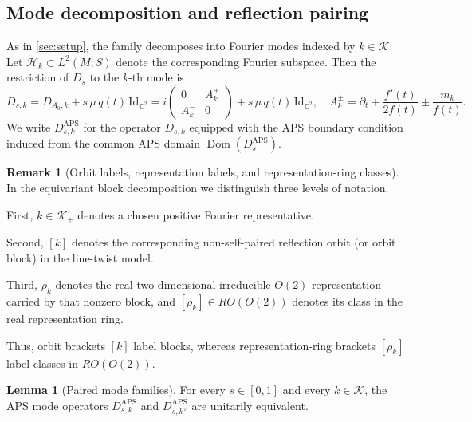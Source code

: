 \documentclass[11pt]{article}
\theoremstyle{definition}
\newtheorem{lemma}[theorem]{Lemma}
\newtheorem{remark}[remark]{Remark}
\DeclareMathOperator{\APS}{APS}
\DeclareMathOperator{\Dom}{Dom} \newcommand{\Z}{\mathbb{Z}} \DeclareMathOperator{\Ran}{Ran}
\numberwithin{equation}{section}
\newcommand{\Id}{\text{Id}}
\begin{document}
\subsection{Mode decomposition and reflection pairing}
\label{subsec:O2_sf_modes}




As in \autoref{sec:setup}, the family decomposes into Fourier modes indexed by \(k \in \mathcal K\). 
Let \(\mathcal H_k \subset L^2(M;S)\) denote the corresponding Fourier subspace.
Then the restriction of \(D_s\) to the \(k\)-th mode is
\begin{equation}\label{eq:mode_operator_section6}
D_{s,k}
=
D_{A_0,k}
+
s\,\mu\,q(t)\,\Id_{\mathbb{C}^2}
=
i
\begin{pmatrix}
0 & A_k^+ \\
A_k^- & 0
\end{pmatrix}
+
s\,\mu\,q(t)\,\Id_{\mathbb{C}^2}, \quad 
A_k^\pm
=
\partial_t + \frac{f'(t)}{2f(t)} \pm \frac{m_k}{f(t)}.
\end{equation}
%
We write \(D_{s,k}^{\APS}\) for the operator \(D_{s,k}\) equipped with the APS boundary condition induced from the common
APS domain \(\Dom(D_s^{\APS})\).


\begin{remark}[Orbit labels, representation labels, and representation-ring classes]
\label{rem:orbit_rep_notation}
In the equivariant block decomposition we distinguish three levels of notation.

First, \(k\in\mathcal K_+\) denotes a chosen positive Fourier representative.

Second, \([k]\) denotes the corresponding non-self-paired reflection orbit (or orbit block)
in the line-twist model.

Third, \(\rho_k\) denotes the real two-dimensional irreducible \(O(2)\)-representation
carried by that nonzero block, and \([\rho_k]\in RO(O(2))\) denotes its class in the real
representation ring.

Thus, orbit brackets \([k]\) label blocks, whereas representation-ring brackets
\([\rho_k]\) label classes in \(RO(O(2))\).
\end{remark}



\begin{lemma}[Paired mode families]
\label{lem:paired_mode_families}
For every \(s\in[0,1]\) and every \(k\in\mathcal K\), the APS mode operators
\(D_{s,k}^{\APS}\) and \(D_{s,k^\vee}^{\APS}\) are unitarily equivalent.
\end{lemma}
\end{document}
